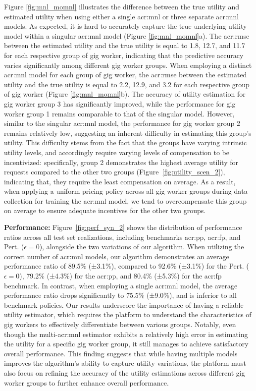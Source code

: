 Figure \ref{fig:mnl_momnl} illustrates the difference between the true utility and estimated utility when using either a single \gls{acr:mnl} or three separate \gls{acr:mnl} models. As expected, it is hard to accurately capture the true underlying utility model within a singular \gls{acr:mnl} model (Figure \ref{fig:mnl_momnl}a). The \gls{acr:rmse} between the estimated utility and the true utility is equal to 1.8, 12.7, and 11.7 for each respective group of gig worker, indicating that the predictive accuracy varies significantly among different gig worker groups. When employing a distinct \gls{acr:mnl} model for each group of gig worker, the \gls{acr:rmse} between the estimated utility and the true utility is equal to 2.2, 12.9, and 3.2 for each respective group of gig worker (Figure \ref{fig:mnl_momnl}b). The accuracy of utility estimation for gig worker group 3 has significantly improved, while the performance for gig worker group 1 remains comparable to that of the singular model. However, similar to the singular \gls{acr:mnl} model, the performance for gig worker group 2 remains relatively low, suggesting an inherent difficulty in estimating this group's utility. This difficulty stems from the fact that the groups have varying intrinsic utility levels, and accordingly require varying levels of compensation to be incentivized: specifically, group 2 demonstrates the highest average utility for requests compared to the other two groups (Figure~\ref{fig:utility_scen_2}), indicating that, they require the least compensation on average. As a result, when applying a uniform pricing policy across all gig worker groups during data collection for training the \gls{acr:mnl} model, we tend to overcompensate this group on average to ensure adequate incentives for the other two groups.

\noindent \textbf{Performance:} Figure~\ref{fig:perf_syn_2} shows the distribution of performance ratios across all test set realizations, including benchmarks \gls{acr:pp}, \gls{acr:fp}, and Pert. ($\epsilon=0$), alongside the two variations of our algorithm. When utilizing the correct number of \gls{acr:mnl} models, our algorithm demonstrates an average performance ratio of 89.5\% (±3.1\%), compared to 92.6\% (±3.1\%) for the Pert. ($\epsilon=0$), 79.2\% (±4.3\%) for the \gls{acr:pp}, and 80.4\% (±5.3\%) for the \gls{acr:fp} benchmark. In contrast, when employing a single \gls{acr:mnl} model, the average performance ratio drops significantly to 75.5\% (±9.0\%), and is inferior to all benchmark policies. Our results underscore the importance of having a reliable utility estimator, which requires the platform to understand the characteristics of gig workers to effectively differentiate between various groups. Notably, even though the multi-\gls{acr:mnl} estimator exhibits a relatively high error in estimating the utility for a specific gig worker group, it still manages to achieve satisfactory overall performance. This finding suggests that while having multiple models improves the algorithm's ability to capture utility variations, the platform must also focus on refining the accuracy of the utility estimations across different gig worker groups to further enhance overall performance.

